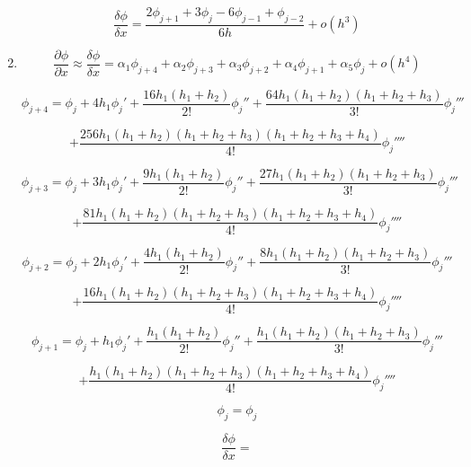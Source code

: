 \documentclass[12pt,a4paper]{report}
\begin{document}
\begin{enumerate}
$$\frac{\delta\phi}{\delta x} = \frac{2\phi_{j+1} + 3\phi_j - 6\phi_{j-1} + \phi_{j-2}}{6h} + o\left(h^3\right)$$


\pagebreak

\item {}

$$\frac{\partial\phi}{\partial x} \approx \frac{\delta\phi}{\delta x} = \alpha_1\phi_{j+4} + \alpha_2\phi_{j+3} + \alpha_3\phi_{j+2} + \alpha_4\phi_{j+1} + \alpha_5\phi_j + o\left(h^4\right)$$

$$\phi_{j+4} = \phi_j + 4h_1{\phi_j}' + \frac{16h_1\left(h_1 + h_2\right)}{2!}{\phi_j}'' + \frac{64h_1\left(h_1 + h_2\right)\left(h_1 + h_2 + h_3\right)}{3!}{\phi_j}'''$$

$$+ \frac{256h_1\left(h_1 + h_2\right)\left(h_1 + h_2 + h_3\right)\left(h_1 + h_2 + h_3 + h_4\right)}{4!}{\phi_j}''''$$

$$\phi_{j+3} = \phi_j + 3h_1{\phi_j}' + \frac{9h_1\left(h_1 + h_2\right)}{2!}{\phi_j}'' + \frac{27h_1\left(h_1 + h_2\right)\left(h_1 + h_2 + h_3\right)}{3!}{\phi_j}'''$$

$$+ \frac{81h_1\left(h_1 + h_2\right)\left(h_1 + h_2 + h_3\right)\left(h_1 + h_2 + h_3 + h_4\right)}{4!}{\phi_j}''''$$

$$\phi_{j+2} = \phi_j + 2h_1{\phi_j}' + \frac{4h_1\left(h_1 + h_2\right)}{2!}{\phi_j}'' + \frac{8h_1\left(h_1 + h_2\right)\left(h_1 + h_2 + h_3\right)}{3!}{\phi_j}'''$$

$$+ \frac{16h_1\left(h_1 + h_2\right)\left(h_1 + h_2 + h_3\right)\left(h_1 + h_2 + h_3 + h_4\right)}{4!}{\phi_j}''''$$

$$\phi_{j+1} = \phi_j + h_1{\phi_j}' + \frac{h_1\left(h_1 + h_2\right)}{2!}{\phi_j}'' + \frac{h_1\left(h_1 + h_2\right)\left(h_1 + h_2 + h_3\right)}{3!}{\phi_j}'''$$

$$+ \frac{h_1\left(h_1 + h_2\right)\left(h_1 + h_2 + h_3\right)\left(h_1 + h_2 + h_3 + h_4\right)}{4!}{\phi_j}''''$$

$$\phi_j = \phi_j$$

\pagebreak

$$\frac{\delta\phi}{\delta x} = $$
\end{enumerate}
\end{document}
